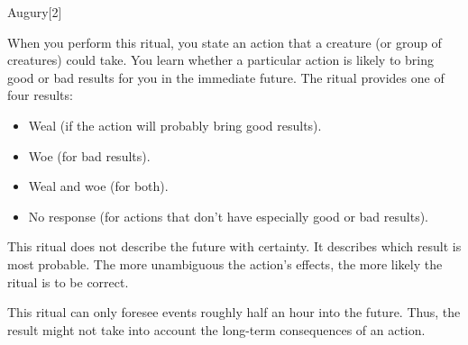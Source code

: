 \begin{spellsection}{Augury}[2]
    \begin{spellheader}
    \end{spellheader}
    \begin{spellcontent}
        \begin{spelltargetinginfo}
        \end{spelltargetinginfo}
        \begin{spelleffects}

            \spellspecial When you perform this ritual, you state an action that a creature (or group of creatures) could take.
            \spelleffect You learn whether a particular action is likely to bring good or bad results for you in the immediate future. The ritual provides one of four results:
            \begin{itemize}
                \item Weal (if the action will probably bring good results).
                \item Woe (for bad results).
                \item Weal and woe (for both).
                \item No response (for actions that don't have especially good or bad results).
            \end{itemize}

            This ritual does not describe the future with certainty. It describes which result is most probable. The more unambiguous the action's effects, the more likely the ritual is to be correct.
        \end{spelleffects}
    \end{spellcontent}
    \begin{spellfooter}
        \spellnotes This ritual can only foresee events roughly half an hour into the future. Thus, the result might not take into account the long-term consequences of an action.
    \end{spellfooter}
\end{spellsection}

